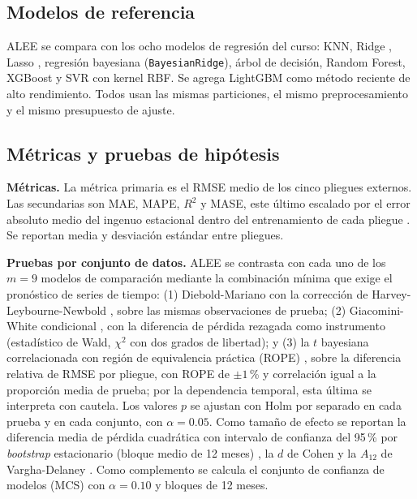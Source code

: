 \documentclass[11pt]{article}
\begin{document}
\subsection{Modelos de referencia}
\label{sec:baselines}

ALEE se compara con los ocho modelos de regresión del curso: KNN, Ridge \cite{hoerl1970}, Lasso \cite{tibshirani1996}, regresión bayesiana (\texttt{BayesianRidge}), árbol de decisión, Random Forest, XGBoost \cite{chen2016} y SVR con kernel RBF. Se agrega LightGBM \cite{ke2017} como método reciente de alto rendimiento. Todos usan las mismas particiones, el mismo preprocesamiento y el mismo presupuesto de ajuste.

\subsection{Métricas y pruebas de hipótesis}
\label{sec:protocolo}

\textbf{Métricas.} La métrica primaria es el RMSE medio de los cinco pliegues externos. Las secundarias son MAE, MAPE, $R^2$ y MASE, este último escalado por el error absoluto medio del ingenuo estacional dentro del entrenamiento de cada pliegue \cite{hyndman2006}. Se reportan media y desviación estándar entre pliegues.

\textbf{Pruebas por conjunto de datos.} ALEE se contrasta con cada uno de los $m=9$ modelos de comparación mediante la combinación mínima que exige el pronóstico de series de tiempo: (1) Diebold-Mariano con la corrección de Harvey-Leybourne-Newbold \cite{dieboldmariano1995,harveyetal1997}, sobre las mismas observaciones de prueba; (2) Giacomini-White condicional \cite{giacominiwhite2006}, con la diferencia de pérdida rezagada como instrumento (estadístico de Wald, $\chi^2$ con dos grados de libertad); y (3) la $t$ bayesiana correlacionada con región de equivalencia práctica (ROPE) \cite{coranibenavoli2015,benavoli2017}, sobre la diferencia relativa de RMSE por pliegue, con ROPE de $\pm1$\,\% y correlación igual a la proporción media de prueba; por la dependencia temporal, esta última se interpreta con cautela. Los valores $p$ se ajustan con Holm \cite{holm1979} por separado en cada prueba y en cada conjunto, con $\alpha=0.05$. Como tamaño de efecto se reportan la diferencia media de pérdida cuadrática con intervalo de confianza del 95\,\% por \textit{bootstrap} estacionario (bloque medio de 12 meses) \cite{politisromano1994}, la $d$ de Cohen y la $A_{12}$ de Vargha-Delaney \cite{varghadelaney2000}. Como complemento se calcula el conjunto de confianza de modelos (MCS) \cite{hansen2011} con $\alpha=0.10$ y bloques de 12 meses.
\end{document}
